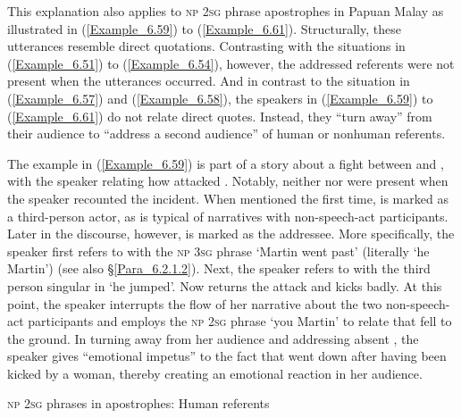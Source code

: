 This explanation also applies to \textsc{np} \textsc{2sg}  phrase apostrophes in Papuan Malay as illustrated in (\ref{Example_6.59}) to (\ref{Example_6.61}). Structurally, these utterances resemble direct quotations. Contrasting with the  situations in (\ref{Example_6.51}) to (\ref{Example_6.54}), however, the addressed referents were not present when the utterances occurred. And in contrast to the  situation in (\ref{Example_6.57}) and (\ref{Example_6.58}), the speakers in (\ref{Example_6.59}) to (\ref{Example_6.61}) do not relate direct quotes. Instead, they “turn away” from their audience to “address a second audience” of human or nonhuman referents.

\largerpage

The example in (\ref{Example_6.59}) is part of a story about a fight between  and , with the speaker relating how  attacked . Notably, neither  nor  were present when the speaker recounted the incident. When mentioned the first time,  is marked as a third-person actor, as is typical of narratives with non-speech-act participants. Later in the discourse, however,  is marked as the addressee. More specifically, the speaker first refers to  with the \textsc{np} \textsc{3sg}  phrase  ‘Martin went past’ (literally ‘he Martin’) (see also §\ref{Para_6.2.1.2}). Next, the speaker refers to  with the third person singular  in  ‘he jumped’. Now  returns the attack and kicks  badly. At this point, the speaker interrupts the flow of her narrative about the two non-speech-act participants and employs the \textsc{np} \textsc{2sg}  phrase  ‘you Martin’ to relate that  fell to the ground. In turning away from her audience and addressing absent , the speaker gives “emotional impetus” to the fact that  went down after having been kicked by a woman, thereby creating an emotional reaction in her audience.



\begin{styleExampleTitle}
\textsc{np} \textsc{2sg}  phrases in apostrophes: Human referents
\end{styleExampleTitle}

